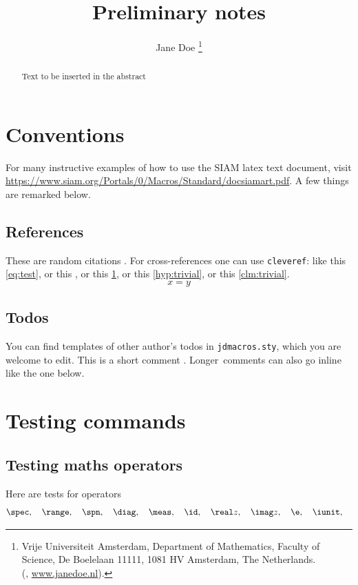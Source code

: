 \documentclass[a4paper]{siamart190516}
\title{Preliminary notes}
\author{%
  Jane Doe%
  \thanks{%
    Vrije Universiteit Amsterdam,
    Department of Mathematics,
    Faculty of Science,
    De Boelelaan 11111,
    1081 HV Amsterdam, The Netherlands.
  \protect\\
    (\email{jane.doe@vu.nl}, \url{www.janedoe.nl}).
  }
}
\begin{document}
\maketitle

\begin{abstract}
  Text to be inserted in the abstract
\end{abstract}

\section{Conventions} \label{sec:conventions}
For many instructive examples of how to use the SIAM latex text document, visit
\url{https://www.siam.org/Portals/0/Macros/Standard/docsiamart.pdf}. A few things are remarked below.

\subsection{References} \label{sec:references}
These are random citations \cite{KoMa14,siam}. For cross-references one can use
\texttt{cleveref}: like this
\cref{eq:test}, or this , or this \cref{sec:conventions}, or
this \cref{hyp:trivial}, or this \cref{clm:trivial}.
\begin{equation}\label{eq:test}
  x = y
\end{equation}


\subsection{Todos}
You can find templates of other author's todos in
\texttt{jdmacros.sty}, which you are welcome to edit.
This is a short comment . Longer comments can also go
inline like the one below.
% 

\section{Testing commands}

\subsection{Testing maths operators}
Here are tests for operators
\[
  \spec, \quad 
  \range, \quad 
  \spn, \quad
  \diag, \quad
  \meas, \quad
  \id, \quad
  \real z, \quad
  \imag z, \quad
  \e, \quad
  \iunit, \quad
\]
\end{document}
